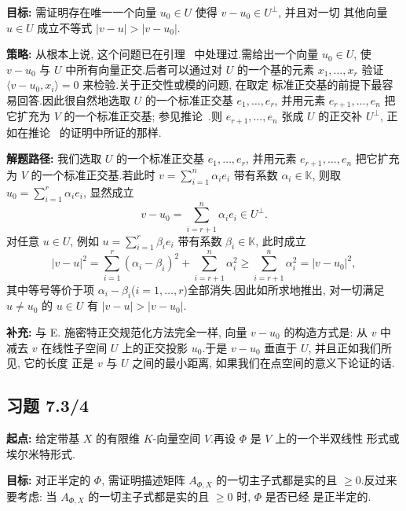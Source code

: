 \noindent\textbf{目标:} 需证明存在唯一一个向量 $u_0 \in U$ 使得 $v - u_0 \in U^{\perp}$, 并且对一切
其他向量 $u \in U$ 成立不等式 $|v - u| > |v - u_0|$.

\noindent\textbf{策略:} 从根本上说, 这个问题已在引理~ 中处理过.需给出一个向量
$u_0 \in U$, 使 $v - u_0$ 与 $U$ 中所有向量正交.后者可以通过对 $U$ 的一个基的元素
$x_1, \ldots, x_r$ 验证 $\langle v - u_0, x_i \rangle = 0$ 来检验.关于正交性或模的问题, 在取定
标准正交基的前提下最容易回答.因此很自然地选取 $U$ 的一个标准正交基 $e_1, \ldots, e_r$, 并用元素
$e_{r+1}, \ldots, e_n$ 把它扩充为 $V$ 的一个标准正交基; 参见推论~.则
$e_{r+1}, \ldots, e_n$ 张成 $U$ 的正交补 $U^{\perp}$, 正如在推论~ 的证明中所证的那样.

\noindent\textbf{解题路径:} 我们选取 $U$ 的一个标准正交基 $e_1, \ldots, e_r$, 并用元素
$e_{r+1}, \ldots, e_n$ 把它扩充为 $V$ 的一个标准正交基.若此时 $v = \sum_{i = 1}^{n} \alpha_i e_i$
带有系数 $\alpha_i \in \mathbb{K}$, 则取 $u_0 = \sum_{i = 1}^{r} \alpha_i e_i$, 显然成立
\[
v - u_0 = \sum_{i = r + 1}^{n} \alpha_i e_i \in U^{\perp}\text{.}
\]
对任意 $u \in U$, 例如 $u = \sum_{i = 1}^{r} \beta_i e_i$ 带有系数 $\beta_i \in \mathbb{K}$, 此时成立
\[
|v - u|^2 = \sum_{i = 1}^{r} (\alpha_i - \beta_i)^2 + \sum_{i = r + 1}^{n} \alpha_i^2 \geq \sum_{i = r + 1}^{n} \alpha_i^2 = |v - u_0|^2,
\]
其中等号等价于项 $\alpha_i - \beta_i$($i = 1, \ldots, r$)全部消失.因此如所求地推出, 对一切满足
$u \neq u_0$ 的 $u \in U$ 有 $|v - u| > |v - u_0|$.

\noindent\textbf{补充:} 与 E. 施密特正交规范化方法完全一样, 向量 $v - u_0$ 的构造方式是: 从 $v$ 中
减去 $v$ 在线性子空间 $U$ 上的正交投影 $u_0$.于是 $v - u_0$ 垂直于 $U$, 并且正如我们所见, 它的长度
正是 $v$ 与 $U$ 之间的最小距离, 如果我们在点空间的意义下论证的话.

\subsection*{习题 7.3/4}

\noindent\textbf{起点:} 给定带基 $X$ 的有限维 $K$-向量空间 $V$.再设 $\varPhi$ 是 $V$ 上的一个半双线性
形式或埃尔米特形式.

\noindent\textbf{目标:} 对正半定的 $\varPhi$, 需证明描述矩阵 $A_{\varPhi, X}$ 的一切主子式都是实的且
$\geq 0$.反过来要考虑: 当 $A_{\varPhi, X}$ 的一切主子式都是实的且 $\geq 0$ 时, $\varPhi$ 是否已经
是正半定的.

